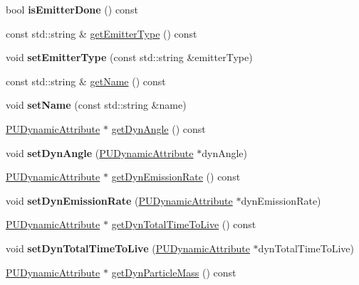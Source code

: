 \begin{DoxyCompactItemize}
bool {\bfseries is\+Emitter\+Done} () const
\item 
const std\+::string \& \hyperlink{classPUEmitter_acb57036fcb7fae68b4dc0b900fc8d542}{get\+Emitter\+Type} () const
\item 
\mbox{\label{classPUEmitter_af96e8544236036fb6e7a9f7bb5597913}} 
void {\bfseries set\+Emitter\+Type} (const std\+::string \&emitter\+Type)
\item 
const std\+::string \& \hyperlink{classPUEmitter_a310d26a2ee5d02a89773d74746f29835}{get\+Name} () const
\item 
\mbox{\label{classPUEmitter_a9cd134f4869abfb180ad56b30db42d48}} 
void {\bfseries set\+Name} (const std\+::string \&name)
\item 
\hyperlink{classPUDynamicAttribute}{P\+U\+Dynamic\+Attribute} $\ast$ \hyperlink{classPUEmitter_a9f87f8a7caeeaf022039e9226d5911b0}{get\+Dyn\+Angle} () const
\item 
\mbox{\label{classPUEmitter_a4f30f5b8ad670ff7087d5c8693e94cf0}} 
void {\bfseries set\+Dyn\+Angle} (\hyperlink{classPUDynamicAttribute}{P\+U\+Dynamic\+Attribute} $\ast$dyn\+Angle)
\item 
\hyperlink{classPUDynamicAttribute}{P\+U\+Dynamic\+Attribute} $\ast$ \hyperlink{classPUEmitter_a97dc56e1db0253013512450407c87387}{get\+Dyn\+Emission\+Rate} () const
\item 
\mbox{\label{classPUEmitter_ab6ad83450f676771b3b60f21c3883e43}} 
void {\bfseries set\+Dyn\+Emission\+Rate} (\hyperlink{classPUDynamicAttribute}{P\+U\+Dynamic\+Attribute} $\ast$dyn\+Emission\+Rate)
\item 
\hyperlink{classPUDynamicAttribute}{P\+U\+Dynamic\+Attribute} $\ast$ \hyperlink{classPUEmitter_abc1cd09d8b9d1db818130406a550a11a}{get\+Dyn\+Total\+Time\+To\+Live} () const
\item 
\mbox{\label{classPUEmitter_af05805e991a246714dbbe7952bde709d}} 
void {\bfseries set\+Dyn\+Total\+Time\+To\+Live} (\hyperlink{classPUDynamicAttribute}{P\+U\+Dynamic\+Attribute} $\ast$dyn\+Total\+Time\+To\+Live)
\item 
\hyperlink{classPUDynamicAttribute}{P\+U\+Dynamic\+Attribute} $\ast$ \hyperlink{classPUEmitter_a2ed7a7c4403e98d58f5770dbc2f9db35}{get\+Dyn\+Particle\+Mass} () const
\item 

\end{DoxyCompactItemize}
